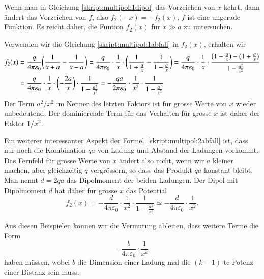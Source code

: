 Wenn man in Gleichung \eqref{skript:multipol:1dipol} das Vorzeichen
von $x$ kehrt, dann ändert das Vorzeichen von $f$, also $f_2(-x)=-f_2(x)$,
$f$ ist eine ungerade Funktion.
Es reicht daher, die Funtion $f_2(x)$ für $x\gg a$ zu untersuchen.

Verwenden wir die Gleichung \eqref{skript:multipol:1abfall} in $f_2(x)$,
erhalten wir
\begin{align}
f_2(x)
&=
\frac{q}{4\pi\varepsilon_0}\biggl(\frac1{x+a}-\frac1{x-a}\biggr)
=
\frac{q}{4\pi\varepsilon_0}\cdot\frac1x\cdot\biggl(
\frac1{1+\frac{a}{x}}
-
\frac1{1-\frac{a}{x}}
\biggr)
=
\frac{q}{4\pi\varepsilon_0}\cdot\frac1x\cdot
\frac{\bigl(1-\frac{a}{x}\bigr)-\bigl(1+\frac{a}{x}\bigr)}{1-\frac{a^2}{x^2}}
\notag
\\
&=
\frac{q}{4\pi\varepsilon_0}\cdot\frac1x\cdot
\biggl(-\frac{2a}{x}\biggr)
\cdot
\frac1{1-\frac{a^2}{x^2}}
=
-\frac{qa}{2\pi\varepsilon_0}\cdot\frac1{x^2}\cdot\frac{1}{1-\frac{a^2}{x^2}}
\label{skript:multipol:2abfall}
\end{align}
Der Term $a^2/x^2$ im Nenner des letzten Faktors ist für grosse Werte von
$x$ wieder unbedeutend.
Der dominierende Term für das Verhalten für grosse $x$ ist daher der
Faktor $1/x^2$.

Ein weiterer interessanter Aspekt der Formel~\eqref{skript:multipol:2abfall}
ist, dass nur noch die Kombination $qa$ von Ladung und Abstand der Ladungen
vorkommt.
Das Fernfeld für grosse Werte von $x$ ändert also nicht, wenn wir $a$
kleiner machen, aber gleichzeitig $q$ vergrössern, so dass das Produkt
$qa$ konstant bleibt.
Man nennt $d=2qa$ das Dipolmoment der beiden Ladungen.
Der Dipol mit Dipolmoment $d$ hat daher für grosse $x$ das Potential
\[
f_2(x)
=
-\frac{d}{4\pi\varepsilon_0}\cdot \frac1{x^2}\cdot \frac1{1-\frac{a^2}{x^2}}
\simeq
-\frac{d}{4\pi\varepsilon_0}\cdot \frac1{x^2}.
\]

Aus diesen Beispielen können wir die Vermutung ableiten, dass weitere
Terme die Form
\[
-\frac{b}{4\pi\varepsilon_0}\cdot\frac1{x^k}
\]
haben müssen, wobei $b$ die Dimension einer Ladung mal die $(k-1)$-te
Potenz einer Distanz sein muss.

